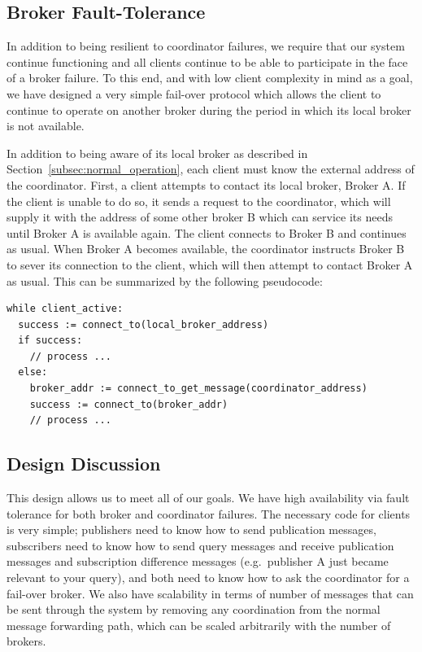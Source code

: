 \subsection{Broker Fault-Tolerance}

In addition to being resilient to coordinator failures, we require that our system continue functioning and all clients continue to be able to participate in the face of a broker failure.
To this end, and with low client complexity in mind as a goal, we have designed a very simple fail-over protocol which allows the client to continue to operate on another broker during the period in which its local broker is not available.

In addition to being aware of its local broker as described in Section~\ref{subsec:normal_operation}, each client must know the external address of the coordinator.
First, a client attempts to contact its local broker, Broker A.
If the client is unable to do so, it sends a request to the coordinator, which will supply it with the address of some other broker B which can service its needs until Broker A is available again.
The client connects to Broker B and continues as usual.
When Broker A becomes available, the coordinator instructs Broker B to sever its connection to the client, which will then attempt to contact Broker A as usual. This can be summarized by the following pseudocode:

\begin{lstlisting}[language=pseudocode,basicstyle=\small]
while client_active:
  success := connect_to(local_broker_address)
  if success:
    // process ...
  else:
    broker_addr := connect_to_get_message(coordinator_address)
    success := connect_to(broker_addr)
    // process ...
\end{lstlisting}

\subsection{Design Discussion}

This design allows us to meet all of our goals.
We have high availability via fault tolerance for both broker and coordinator failures.
The necessary code for clients is very simple; publishers need to know how to send publication messages, subscribers need to know how to send query messages and receive publication messages and subscription difference messages (e.g.\ publisher A just became relevant to your query), and both need to know how to ask the coordinator for a fail-over broker.
We also have scalability in terms of number of messages that can be sent through the system by removing any coordination from the normal message forwarding path, which can be scaled arbitrarily with the number of brokers.

